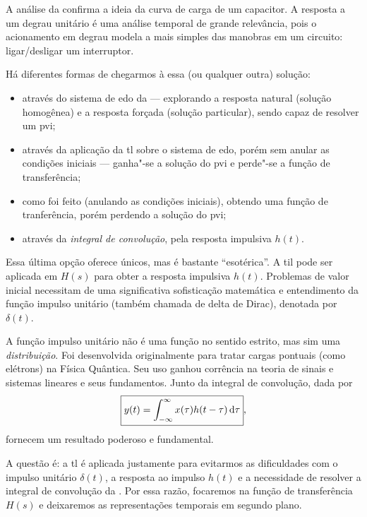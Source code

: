 A análise da  confirma a ideia da curva de carga de um capacitor. A resposta a um degrau unitário é uma análise temporal de grande relevância, pois o acionamento em degrau modela a mais simples das manobras em um circuito: ligar\slash desligar um interruptor.

Há diferentes formas de chegarmos à essa (ou qualquer outra) solução:
\begin{itemize}
	\item através do sistema de \ac{edo} da  --- explorando a resposta natural (solução homogênea) e a resposta forçada (solução particular), sendo capaz de resolver um \ac{pvi};
	\item através da aplicação da \ac{tl} sobre o sistema de \ac{edo}, porém sem anular as condições iniciais --- ganha"-se a solução do \ac{pvi} e perde"-se a função de transferência;
	\item como foi feito (anulando as condições iniciais), obtendo uma função de tranferência, porém perdendo a solução do \ac{pvi};
	\item através da \emph{integral de convolução}, pela resposta impulsiva $h(t)$.
\end{itemize}

Essa última opção oferece  únicos, mas é bastante \enquote{esotérica}. A \ac{til} pode ser aplicada em $H(s)$ para obter a resposta impulsiva $h(t)$. Problemas de valor inicial necessitam de uma significativa sofisticação matemática e entendimento da função impulso unitário (também chamada de delta de Dirac), denotada por $\delta(t)$.

A função impulso unitário não é uma função no sentido estrito, mas sim uma \emph{distribuição}. Foi desenvolvida originalmente para tratar cargas pontuais (como elétrons) na Física Quântica. Seu uso ganhou corrência na teoria de sinais e sistemas lineares e seus fundamentos. Junto da integral de convolução, dada por
\begin{equation}\label{eq:conv}
	\boxed{y(t)=\inte{x(\tau)h(t-\tau)}{\tau}{-\infty}{\infty}},
\end{equation}
fornecem um resultado poderoso e fundamental.

A questão é: a \ac{tl} é aplicada justamente para evitarmos as dificuldades com o impulso unitário $\delta(t)$, a resposta ao impulso $h(t)$ e a necessidade de resolver a integral de convolução da . Por essa razão, focaremos na função de transferência $H(s)$ e deixaremos as representações temporais em segundo plano.

